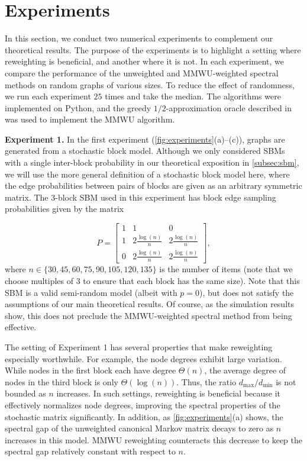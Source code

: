 \documentclass[sigconf,nonacm,pbalance]{acmart}
\begin{document}
\section{Experiments}\label{sec:experiments}
In this section, we conduct two numerical experiments to complement our theoretical results. The purpose of the experiments is to highlight a setting where reweighting is beneficial, and another where it is not. In each experiment, we compare the performance of the unweighted and MMWU-weighted spectral methods on random graphs of various sizes. To reduce the effect of randomness, we run each experiment $25$ times and take the median. The algorithms were implemented on Python, and the greedy $1/2$-approximation oracle described in \cite[Theorem 5]{MonotoneAdversary} was used to implement the MMWU algorithm.

\textbf{Experiment 1.} In the first experiment (\cref{fig:experiments}(a)--(c)), graphs are generated from a stochastic block model. Although we only considered SBMs with a single inter-block probability in our theoretical exposition in \cref{subsec:sbm}, we will use the more general definition of a stochastic block model here, where the edge probabilities between pairs of blocks are given as an arbitrary symmetric matrix. The $3$-block SBM used in this experiment has block edge sampling probabilities given by the matrix

\begin{equation}
    P=\begin{bmatrix}
        1 & 1 & 0 \\
        1 & 2 \frac{\log(n)}{n} & 2 \frac{\log(n)}{n} \\
        0 & 2 \frac{\log(n)}{n} & 2 \frac{\log(n)}{n}
    \end{bmatrix},\label{eq:sbm-matrix}
\end{equation}
where $n\in\{30, 45, 60, 75, 90, 105, 120, 135\}$ is the number of items (note that we choose multiples of $3$ to ensure that each block has the same size). Note that this SBM is a valid semi-random model (albeit with $p=0$), but does not satisfy the assumptions of our main theoretical results. Of course, as the simulation results show, this does not preclude the MMWU-weighted spectral method from being effective.

The setting of Experiment 1 has several properties that make reweighting especially worthwhile. For example, the node degrees exhibit large variation. While nodes in the first block each have degree $\Theta(n)$, the average degree of nodes in the third block is only $\Theta(\log(n))$. Thus, the ratio $d_{\text{max}}/d_{\text{min}}$ is not bounded as $n$ increases. In such settings, reweighting is beneficial because it effectively normalizes node degrees, improving the spectral properties of the stochastic matrix significantly. In addition, as \cref{fig:experiments}(a) shows, the spectral gap of the unweighted canonical Markov matrix decays to zero as $n$ increases in this model. MMWU reweighting counteracts this decrease to keep the spectral gap relatively constant with respect to $n$.
\end{document}
